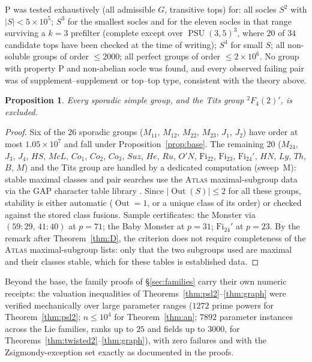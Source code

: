 \documentclass[11pt]{amsart}
\newtheorem{proposition}[theorem]{Proposition}
\theoremstyle{definition}
\theoremstyle{remark}
\DeclareMathOperator{\Out}{Out}
\DeclareMathOperator{\PSU}{PSU}
\begin{document}
\begin{enumerate}
$\mathrm{P}$ was tested exhaustively (all admissible $G$, transitive
tops) for: all socles $S^2$ with $|S|<5\times10^5$; $S^3$ for the
smallest socles and for the eleven socles in that range surviving a
$k=3$ prefilter (complete except over $\PSU(3,5)^3$, where $20$ of $34$
candidate tops have been checked at the time of writing);
$S^4$ for small $S$; all non-soluble groups of order $\leq2000$;
all perfect groups of order $\leq2\times10^6$. No group with property
$\mathrm{P}$ and non-abelian socle was found, and every observed failing
pair was of supplement--supplement or top--top type, consistent with
the theory above.
\end{enumerate}

\begin{proposition}\label{prop:sporadic}
Every sporadic simple group, and the Tits group ${}^2F_4(2)'$, is
excluded.
\end{proposition}

\begin{proof}
Six of the $26$ sporadic groups ($M_{11}$, $M_{12}$, $M_{22}$,
$M_{23}$, $J_1$, $J_2$) have order at most $1.05\times10^7$ and fall
under Proposition~\ref{prop:base}. The remaining $20$ ($M_{24}$, $J_3$,
$J_4$, $HS$, $McL$, $Co_1$, $Co_2$, $Co_3$, $Suz$, $He$, $Ru$, $O'N$,
$\mathrm{Fi}_{22}$, $\mathrm{Fi}_{23}$, $\mathrm{Fi}_{24}'$, $HN$,
$Ly$, $Th$, $B$, $M$) and the Tits group are handled by a dedicated
computation (sweep~M): stable maximal classes and pair searches use the
\textsc{Atlas} maximal-subgroup data via the GAP character table
library \cite{CTblLib,ATLAS}. Since $|\Out(S)|\leq2$ for all these
groups, stability is either automatic ($\Out=1$, or a unique class of
its order) or checked against the stored class fusions. Sample
certificates: the Monster via $(59{:}29,\,41{:}40)$ at $p=71$; the
Baby Monster at $p=31$; $\mathrm{Fi}_{24}'$ at $p=23$. By the remark
after Theorem~\ref{thm:D}, the criterion does not require completeness
of the \textsc{Atlas} maximal-subgroup lists: only that the two
subgroups used are maximal and their classes stable, which for these
tables is established data.
\end{proof}

Beyond the base, the family proofs of \S\ref{sec:families} carry their
own numeric receipts: the valuation inequalities of
Theorems~\ref{thm:psl2}--\ref{thm:graph} were verified mechanically over
large parameter ranges ($1272$ prime powers for Theorem~\ref{thm:psl2};
$n\leq10^4$ for Theorem~\ref{thm:an}; $7892$ parameter instances across
the Lie families, ranks up to $25$ and fields up to $3000$, for
Theorems~\ref{thm:twisted2}--\ref{thm:graph}), with zero failures and
with the Zsigmondy-exception set exactly as documented in the proofs.
\end{document}
